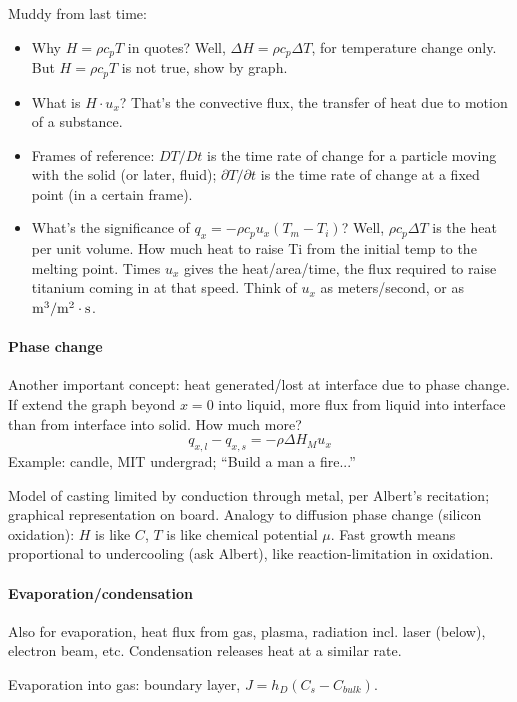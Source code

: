 \documentclass{report}
\begin{document}
\noindent Muddy from last time:
\begin{itemize}
\item Why $H=\rho c_pT$ in quotes?  Well, $\Delta H=\rho c_p\Delta T$, for
  temperature change only.  But $H=\rho c_pT$ is not true, show by graph.
\item What is $H\cdot u_x$?  That's the convective flux, the transfer of heat
  due to motion of a substance.
\item Frames of reference: $DT/Dt$ is the time rate of change for a particle
  moving with the solid (or later, fluid); $\partial T/\partial t$ is the time
  rate of change at a fixed point (in a certain frame).
\item What's the significance of $q_x = -\rho c_pu_x (T_m-T_i)$?  Well, $\rho
  c_p\Delta T$ is the heat per unit volume.  How much heat to raise Ti from the
  initial temp to the melting point.  Times $u_x$ gives the heat/area/time, the
  flux required to raise titanium coming in at that speed.  Think of $u_x$ as
  meters/second, or as $\rm m^3/m^2\cdot s$.
\end{itemize}

\paragraph{Phase change}

Another important concept: heat generated/lost at interface due to phase
change.  If extend the graph beyond $x=0$ into liquid, more flux from liquid
into interface than from interface into solid.  How much more?
$$q_{x,l} - q_{x,s} = -\rho \Delta H_M u_x$$
Example: candle, MIT undergrad; ``Build a man a fire...''

Model of casting limited by conduction through metal, per Albert's recitation;
graphical representation on board.  Analogy to diffusion phase change (silicon
oxidation): $H$ is like $C$, $T$ is like chemical potential $\mu$.  Fast growth
means proportional to undercooling (ask Albert), like reaction-limitation in
oxidation.

\paragraph{Evaporation/condensation}

Also for evaporation, heat flux from gas, plasma, radiation incl. laser
(below), electron beam, etc.  Condensation releases heat at a similar rate.

Evaporation into gas: boundary layer, $J=h_D(C_s-C_{bulk})$.
\end{document}
